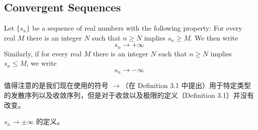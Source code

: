 \documentclass[../poma-notes.tex]{subfiles}
\begin{document}
\subsection*{Convergent Sequences}

\begin{definition}
  Let $\{s_n\}$ be a sequence of real numbers with the following property: For every real $M$ there is an integer $N$ such that $n \ge N$
  implies $s_n \ge M$. We then write
  \[ s_n \to + \infty \]
  Similarly, if for every real $M$ there is an integer $N$ such that $n \ge N$ implies $s_n \le M$, we write
  \[ s_n \to - \infty \]
\end{definition}

值得注意的是我们现在使用的符号 $\to$（在 Definition 3.1 中提出）用于特定类型的发散序列以及收敛序列，但是对于收敛以及极限的定义（Definition 3.1）并没有改变。

\anote $s_n \to \pm \infty$ 的定义。
\end{document}
